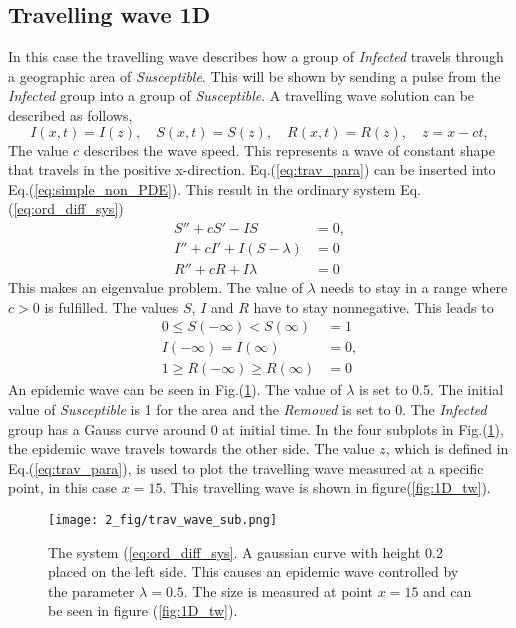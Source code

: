 \documentclass[%
twoside,                 %
final,                   %
chapterprefix=true,      %
open=right               %
10pt]{book}
\begin{document}
\subsection{Travelling wave 1D}
In this case the travelling wave describes how a group of \emph{Infected} travels through a geographic area of \emph{Susceptible}. This will be shown by sending a pulse from the \emph{Infected} group into a group of \emph{Susceptible}. A travelling wave solution can be described as follows,
\begin{equation} \label{eq:trav_para}
I(x,t)=I(z),\quad S(x,t)=S(z),\quad R(x,t) = R(z),\quad z = x-ct,
\end{equation}
The value $c$ describes the wave speed. This represents a wave of constant shape that travels in the positive x-direction. Eq.(\ref{eq:trav_para}) can be inserted into Eq.(\ref{eq:simple_non_PDE}). This result in the ordinary system Eq.(\ref{eq:ord_diff_sys})
\begin{equation} \label{eq:ord_diff_sys}
	\begin{aligned}
	S'' + cS' - IS &= 0,\\
	I'' + cI' + I(S-\lambda)&=0\\
	R'' + cR  + I\lambda &=0
	\end{aligned}
\end{equation}
This makes an eigenvalue problem. The value of $\lambda$ needs to stay in a range where $c > 0$ is fulfilled. The values $S$, $I$ and $R$ have to stay nonnegative. This leads to
\begin{equation} 
	\begin{aligned}
	0 \leq S(-\infty) < S(\infty)&=1\\
	I(-\infty)=I(\infty)&=0,\\
	1 \geq R(-\infty)\geq R(\infty) &= 0
	\end{aligned}
\end{equation}
An epidemic wave can be seen in Fig.(\ref{fig:1D_sub}). The value of $\lambda$ is set to 0.5. The initial value of \emph{Susceptible} is 1 for the area and the \emph{Removed} is set to 0. The \emph{Infected} group has a Gauss curve around 0 at initial time. In the four subplots in Fig.(\ref{fig:1D_sub}), the epidemic wave travels towards the other side. The value $z$, which is defined in Eq.(\ref{eq:trav_para}), is used to plot the travelling wave measured at a specific point, in this case $x=15$. This travelling wave is shown in figure(\ref{fig:1D_tw}).       


\begin{figure}[ht]
  \centerline{\texttt{[image: 2\_fig/trav\_wave\_sub.png]}}
  \caption{
  \label{fig:1D_sub} The system (\ref{eq:ord_diff_sys}. A gaussian curve with height 0.2 placed on the left side. This causes an epidemic wave controlled by the parameter $\lambda=0.5$. The size is measured at point $x=15$ and can be seen in figure (\ref{fig:1D_tw}).
  }
\end{figure}
\end{document}
